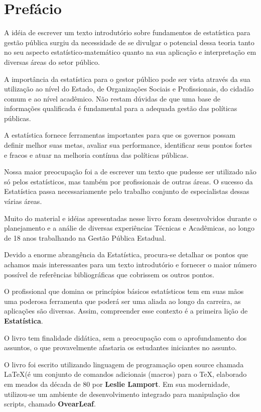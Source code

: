\chapter*{Prefácio}

\inic A idéia de escrever um texto introdutório sobre fundamentos de estatística para gestão pública surgiu da necessidade de se divulgar o potencial dessa teoria tanto no
seu aspecto estatístico-matemático quanto na sua aplicação e
interpretação em diversas áreas do setor público.\vst

A importância da estatística para o gestor público pode ser vista através da sua utilização ao nível do Estado, de Organizações Sociais e Profissionais, do cidadão comum e ao nível acadêmico. Não restam dúvidas de que uma base de informações qualificada é fundamental para a adequada gestão das políticas públicas.\vst  

A estatística fornece ferramentas importantes para que os governos possam definir melhor suas metas, avaliar sua performance, identificar seus pontos fortes e fracos e atuar na melhoria contínua das políticas públicas.
\vst

Nossa maior preocupação foi a de escrever um texto que pudesse ser
utilizado não só pelos estatísticos, mas também por profissionais de outras áreas. O sucesso da Estatística passa necessariamente
pelo trabalho conjunto de especialistas dessas várias áreas. \vst

Muito do material e idéias apresentadas nesse livro foram
desenvolvidos durante o planejamento e a análie de diversas experiências Técnicas e Acadêmicas, ao longo de 18 anos trabalhando na Gestão Pública Estadual.
\vst 


Devido a enorme abrangência da Estatística, procura-se detalhar os pontos que achamos mais interessantes para um texto introdutório e
fornecer o maior número possível de referências bibliográficas que
cobrissem os outros pontos.\vst

O profissional que domina os princípios básicos estatísticos tem em suas mãos uma poderosa ferramenta que poderá ser uma aliada ao longo da carreira, as aplicações são diversas. Assim, compreender esse contexto é a primeira lição de \textbf{Estatística}.
\vst

\newpage
O livro tem finalidade didática, sem a preocupação com o aprofundamento dos assuntos, o que provavelmente afastaria os estudantes iniciantes no assunto.\vst 


O livro foi escrito utilizando linguagem de programação open source chamada \LaTeX (é um conjunto de comandos adicionais (macros) para o \TeX, elaborado em meados da década de 80 por \textbf{Leslie Lamport}. Em sua modernidade, utilizou-se um ambiente de desenvolvimento integrado para manipulação dos scripts, chamado \textbf{OvearLeaf}.
\vst

